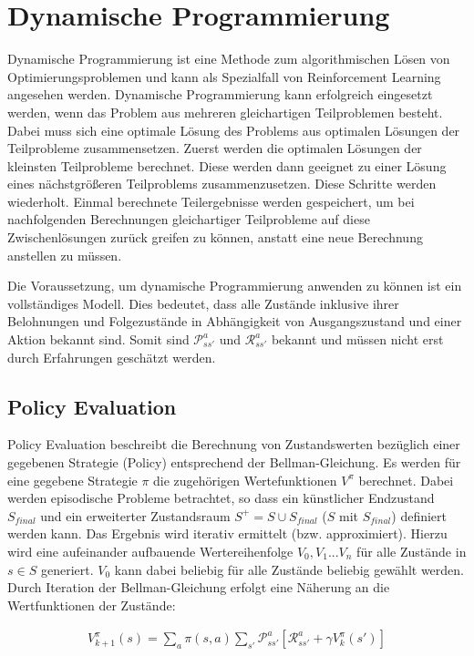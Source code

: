 \documentclass[10pt]{scrartcl}
\begin{document}
\section{Dynamische Programmierung}

Dynamische Programmierung ist eine Methode zum algorithmischen Lösen von Optimierungsproblemen und kann als Spezialfall von Reinforcement Learning angesehen werden. Dynamische Programmierung kann erfolgreich eingesetzt werden, wenn das Problem aus mehreren gleichartigen Teilproblemen besteht. Dabei muss sich eine optimale Lösung des Problems aus optimalen Lösungen der Teilprobleme zusammensetzen. Zuerst werden die optimalen Lösungen der kleinsten Teilprobleme berechnet. Diese werden dann geeignet zu einer Lösung eines nächstgrößeren Teilproblems zusammenzusetzen. Diese Schritte werden wiederholt. Einmal berechnete Teilergebnisse werden gespeichert, um bei nachfolgenden Berechnungen gleichartiger Teilprobleme auf diese Zwischenlösungen zurück greifen zu können, anstatt eine neue Berechnung anstellen zu müssen. 

Die Voraussetzung, um dynamische Programmierung anwenden zu können ist ein vollständiges Modell. Dies bedeutet, dass alle Zustände inklusive ihrer Belohnungen und Folgezustände in Abhängigkeit von Ausgangszustand und einer Aktion bekannt sind.
Somit sind $\mathcal{P}^{a}_{ss'}$ und $\mathcal{R}^{a}_{ss'}$ bekannt und müssen nicht erst durch Erfahrungen geschätzt werden.

\subsection{Policy Evaluation}
Policy Evaluation beschreibt die Berechnung von Zustandswerten bezüglich einer gegebenen Strategie (Policy) entsprechend der Bellman-Gleichung. Es werden für eine gegebene Strategie $\pi$ die zugehörigen Wertefunktionen $V^{\pi}$ berechnet. Dabei werden episodische Probleme betrachtet, so dass ein künstlicher Endzustand $S_{final}$  und ein erweiterter Zustandsraum $S^+=S\cup{S_{final}}$ ($S$ mit $S_{final}$) definiert werden kann. Das Ergebnis wird iterativ ermittelt (bzw. approximiert). Hierzu wird eine aufeinander aufbauende Wertereihenfolge $V_0, V_1 ... V_n$ für alle Zustände in $s \in S$ generiert. $V_0$ kann dabei beliebig für alle Zustände beliebig gewählt werden. Durch Iteration der Bellman-Gleichung erfolgt eine Näherung an die Wertfunktionen der Zustände:

\begin{align}
V^\pi_{k+1}(s) = \sum\limits_{a} \pi(s,a) \sum\limits_{s'}\mathcal{P}^a_{ss'}[\mathcal{R}^a_{ss'}+\gamma V^\pi_k(s')]
\end{align}
\end{document}
